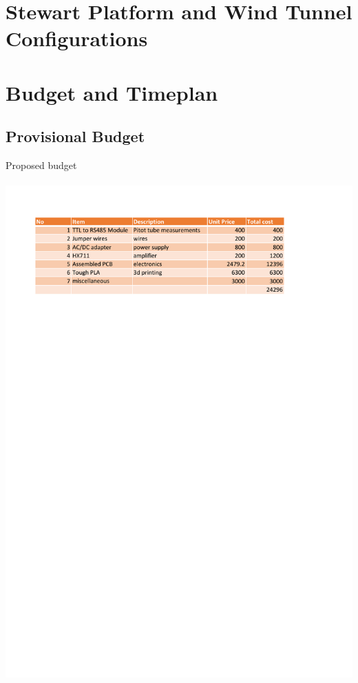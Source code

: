 \appendix
{}
\section*{}
 \section{Stewart Platform and Wind Tunnel Configurations}
 
 
 \section{Budget and Timeplan}
 \subsection{Provisional Budget}
 \begin{center}
 \begin{table}[!h]
 \centering
 \caption{Proposed budget}
 \paragraph{ }
 \includegraphics{Figures/budget}
 \end{table}
 \end{center}
 \clearpage
